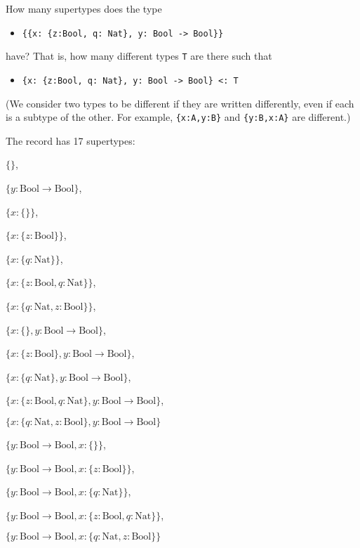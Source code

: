 \documentclass[12pt]{article}
\newenvironment{problem}[2][Problem]{\begin{trivlist}
\item[\hskip \labelsep {\bfseries #1}\hskip \labelsep {\bfseries #2.}]}{\end{trivlist}}
\begin{document}
\pagebreak
\begin{problem}{4 (1 point)}
  How many supertypes does the type
  \begin{itemize}
  \item [ ] \lstinline|{{x: {z:Bool, q: Nat}, y: Bool -> Bool}}|
  \end{itemize}
  have? That is, how many different types \lstinline|T| are there such
  that
  \begin{itemize}
  \item[ ] \lstinline|{x: {z:Bool, q: Nat}, y: Bool -> Bool} <: T|
  \end{itemize}
  (We consider two types to be
  different if they are written differently, even if each is a subtype
  of the other. For example, \lstinline|{x:A,y:B}| and
  \lstinline|{y:B,x:A}| are different.)
  
  The record has 17 supertypes:
  
  $\{\}$,
  
  $\{y: \text{Bool} \rightarrow \text{Bool}\}$,
  
  $\{x: \{\}\}$,
  
  $\{x: \{z: \text{Bool}\}\}$,
  
  $\{x: \{q: \text{Nat}\}\}$,
  
  $\{x: \{z: \text{Bool}, q: \text{Nat}\}\}$,
  
  $\{x: \{q: \text{Nat}, z: \text{Bool}\}\}$,
  
  $\{x: \{\}, y: \text{Bool} \rightarrow \text{Bool}\}$,
  
  $\{x: \{z: \text{Bool}\}, y: \text{Bool} \rightarrow \text{Bool}\}$,
  
  $\{x: \{q: \text{Nat}\}, y: \text{Bool} \rightarrow \text{Bool}\}$,
  
  $\{x: \{z: \text{Bool}, q: \text{Nat}\}, y: \text{Bool} \rightarrow \text{Bool}\}$,
  
  $\{x: \{q: \text{Nat}, z: \text{Bool}\}, y: \text{Bool} \rightarrow \text{Bool}\}$
  
  $\{y: \text{Bool} \rightarrow \text{Bool}, x: \{\}\}$,
  
  $\{y: \text{Bool} \rightarrow \text{Bool}, x: \{z: \text{Bool}\}\}$,
  
  $\{y: \text{Bool} \rightarrow \text{Bool}, x: \{q: \text{Nat}\}\}$,
  
  $\{y: \text{Bool} \rightarrow \text{Bool}, x: \{z: \text{Bool}, q: \text{Nat}\}\}$,
  
  $\{y: \text{Bool} \rightarrow \text{Bool}, x: \{q: \text{Nat}, z: \text{Bool}\}\}$
  
\end{problem}
\end{document}
